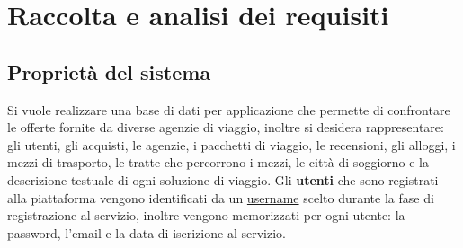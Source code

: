 \section{Raccolta e analisi dei requisiti}
\subsection{Proprietà del sistema}

%
%
Si vuole realizzare una base di dati per applicazione che permette di confrontare le offerte fornite da diverse agenzie di viaggio, inoltre si desidera rappresentare: gli utenti, gli acquisti, le agenzie, i pacchetti di viaggio, le recensioni, gli alloggi, i mezzi di trasporto, le tratte che percorrono i mezzi, le città di soggiorno e la descrizione testuale di ogni soluzione di viaggio.
%
%
Gli \textbf{utenti} che sono registrati alla piattaforma vengono identificati da un \underline{username} scelto durante la fase di registrazione al servizio, inoltre vengono memorizzati per ogni utente: la password, l'email e la data di iscrizione al servizio.

